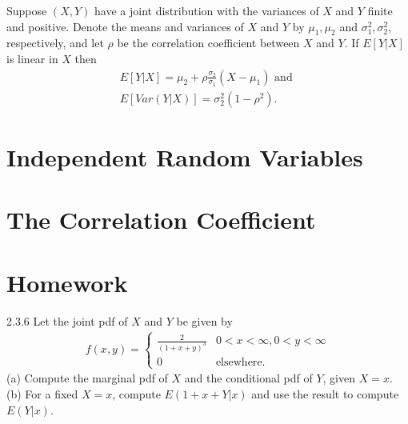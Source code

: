 \begin{theorem}{}{}
    Suppose $(X,Y)$ have a joint distribution with the variances of $X$ and $Y$ finite and positive.
    Denote the means and variances of $X$ and $Y$ by $\mu_1,\mu_2$ and $\sigma_1^2,\sigma_2^2$, respectively,
    and let $\rho$ be the correlation coefficient between $X$ and $Y$. If $E[Y|X]$ is linear in $X$ then
    \begin{align*}
        E[Y|X] = \mu_2 + \rho \frac{\sigma_2}{\sigma_1}(X-\mu_1) \text{ and }\\
        E[Var(Y|X)] = \sigma_2^2(1-\rho^2).
    \end{align*}
\end{theorem}



\section{Independent Random Variables}

\section{The Correlation Coefficient}

\section{Homework}

\begin{exercise}{2.3.6}{}
    Let the joint pdf of $X$ and $Y$ be given by
    \begin{align*}
        f(x,y) = \left\{\begin{matrix}
            \frac{2}{(1+x+y)^3} & 0<x<\infty, 0<y<\infty\\
            0 & \text{elsewhere}.
           \end{matrix}\right.
    \end{align*}
    (a) Compute the marginal pdf of $X$ and the conditional pdf of $Y$, given $X=x$.\\
    (b) For a fixed $X=x$, compute $E(1+x+Y|x)$ and use the result to compute $E(Y|x)$.
\end{exercise}

